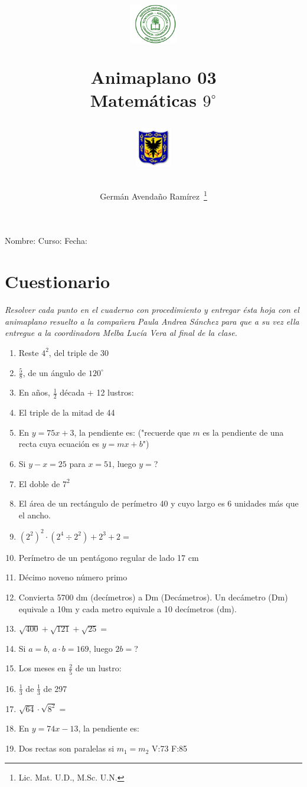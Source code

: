 \documentclass[11pt,twoside,letter]{article}
\author{Germ\'an Avenda\~no Ram\'irez~\thanks{Lic. Mat. U.D., M.Sc. U.N.}}
\title{\begin{minipage}{.2\textwidth}
\includegraphics[height=1.75cm]{Images/logo-colegio.png}\end{minipage}
\begin{minipage}{.55\textwidth}
\begin{center}
Animaplano 03\\
Matemáticas $9^{\circ}$
\end{center}
\end{minipage}\hfill
\begin{minipage}{.2\textwidth}
\includegraphics[height=1.75cm]{Images/logo-sed.png} 
\end{minipage}}
\date{}
\begin{document}
\maketitle
Nombre: \hrulefill Curso: \underline{\hspace*{44pt}} Fecha: \underline{\hspace*{2.5cm}}
\section*{Cuestionario}
\textit{Resolver cada punto en el cuaderno con procedimiento y entregar ésta hoja con el animaplano resuelto a la compañera Paula Andrea Sánchez para que a su vez ella entregue a la coordinadora Melba Lucía Vera al final de la clase.}
\begin{enumerate}
 \item Reste $4^{2}$, del triple de 30
 \item $\frac{5}{8}$, de un ángulo de $120^{\circ}$
 \item En años, $\frac{1}{2}$ década + 12 lustros:
 \item El triple de la mitad de 44
 \item En $y=75x+3$, la pendiente es: ("recuerde que $m$ es la pendiente de una recta cuya ecuaci\'{o}n es $y=mx+b$")
 \item Si $y-x=25$ para $x=51$, luego $y=$?
 \item El doble de $7^{2}$
 \item El área de un rectángulo de perímetro 40 y cuyo largo es 6 unidades más que el ancho.
 \item $(2^{2})^{2}\cdot (2^{4}\div 2^{2})+2^{3}+2=$
 \item Perímetro de un pentágono regular de lado 17 cm
 \item Décimo noveno número primo
 \item Convierta 5700 dm (decímetros) a Dm (Decámetros). Un decámetro (Dm) equivale a 10m y cada metro equivale a 10 decímetros (dm).
 \item $\sqrt{400}+\sqrt{121}+\sqrt{25}=$
 \item Si $a=b$, $a\cdot b=169$, luego $2b=$?
 \item Los meses en $\frac{2}{5}$ de un lustro:
 \item $\frac{1}{3}$ de $\frac{1}{3}$ de 297
 \item $\sqrt{64}\cdot \sqrt{8^{2}}=$
 \item En $y=74x-13$, la pendiente es:
 \item Dos rectas son paralelas si $m_{1}=m_{2}$ V:73 \quad F:85

\end{enumerate}
\end{document}
